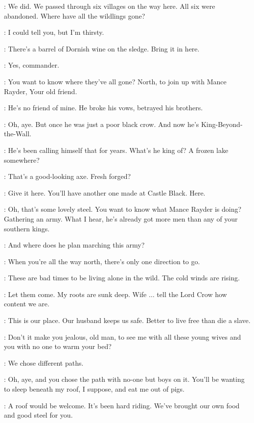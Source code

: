 \JEOR: We did. We passed through six villages on the way here. All six were abandoned. Where have all the wildlings gone?

\CRASTER: I could tell you, but I'm thirsty.

\JEOR: There's a barrel of Dornish wine on the sledge. Bring it in here.

\WATCHMANa: Yes, commander.

\CRASTER: You want to know where they've all gone? North, to join up with Mance Rayder, Your old friend.

\JEOR: He's no friend of mine. He broke his vows, betrayed his brothers.

\CRASTER: Oh, aye. But once he was just a poor black crow. And now he's King-Beyond-the-Wall.

\JEOR: He's been calling himself that for years. What's he king of? A frozen lake somewhere?

\CRASTER:  That's a good-looking axe. Fresh forged?

\JEOR: Give it here. You'll have another one made at Castle Black. Here.

\CRASTER: Oh, that's some lovely steel. You want to know what Mance Rayder is doing? Gathering an army. What I hear, he's already got more men than any of your southern kings.

\JEOR: And where does he plan marching this army?

\CRASTER: When you're all the way north, there's only one direction to go.

\JEOR: These are bad times to be living alone in the wild. The cold winds are rising.

\CRASTER: Let them come. My roots are sunk deep. Wife $\ldots$ tell the Lord Crow how content we are.

\GILLY: This is our place. Our husband keeps us safe. Better to live free than die a slave.

\CRASTER: Don't it make you jealous, old man, to see me with all these young wives and you with no one to warm your bed?

\JEOR: We chose different paths.

\CRASTER: Oh, aye, and you chose the path with no-one but boys on it. You'll be wanting to sleep beneath my roof, I suppose, and eat me out of pigs.

\JEOR: A roof would be welcome. It's been hard riding. We've brought our own food and good steel for you.


